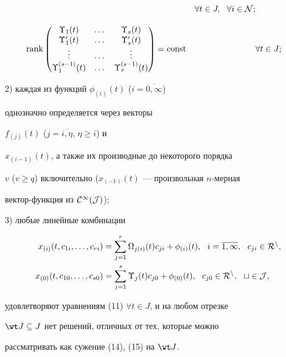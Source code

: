 \begin{defn}
\begin{alignat}{2}
&\ \ &\forall t \in J, \ \  \forall i \in \cal N; \\[3mm]


%


\rank


&\begin{pmatrix}


\Upsilon_{1}(t) & \dotsc &


\Upsilon_{s}(t)\\ \Upsilon'_{1}(t) & \dotsc & \Upsilon'_{s}(t)\\


\vdots & \dotsc & \vdots \\


\Upsilon_{1}^{(s-1)}(t) & \dotsc & \Upsilon_{s}^{(s-1)}(t)


\end{pmatrix}


=\const &\ \ & \forall t \in J;


\end{alignat}





\noindent{}2) каждая из функций $\phi_{(i)}(t)$ ($i=\overline{0,\infty }$)


однозначно определяется через векторы


$f_{(j)}(t)$ ($j=\overline{i,\eta}$, $\eta \ge i$) и


$x_{(i-1)}(t)$, а также их производные до некоторого порядка


$v$ ($v \ge q$) включительно ($x_{(-1)}(t)$ --- произвольная $n$-мерная


вектор-функция из $\cal C^{\infty }(J)$);





\noindent{}3) любые линейные комбинации


\begin{align}


x_{(i)}(t,c_{1i}, \dotsc, c_{ri})&= \sum_{j=1}^{r}{\Omega_{j(i)}(t)c_{ji}}+


\phi_{(i)}(t), \ \ i=\overline{1, \infty},\ \ c_{ji} \in \cal R^n, \\


%


x_{(0)}(t,c_{10}, \dotsc, c_{s0})&= \sum_{j=1}^{s}{\Upsilon_{j}(t)c_{j0}}+


\phi_{(0)}(t), \ \ c_{j0} \in \cal R^n,\ \ t \in J,


\end{align}


удовлетворяют уравнениям (11) $\forall t \in J$, и на любом отрезке


$\wt J \subseteq J$ нет решений, отличных от тех, которые можно


рассматривать как сужение (14), (15) на $\wt J$.


\end{defn}





